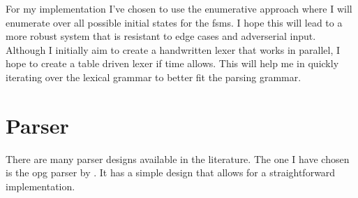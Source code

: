 For my implementation I've chosen to use the enumerative approach where I will
enumerate over all possible initial states for the \glspl{fsm}. I hope  this will
lead to a more robust system that is resistant to edge cases and adverserial
input. Although I initially aim to create a handwritten lexer that works in
parallel, I hope to create a table driven lexer if time allows. This will help
me in quickly iterating over the lexical grammar to better fit the parsing
grammar.

\section{Parser} \label{parser}

There are many parser designs available in the literature. The one I have chosen
is the \gls{opg} parser by \cite{barenghi_parallel_2015}. It has a simple design
that allows for a straightforward implementation. 


